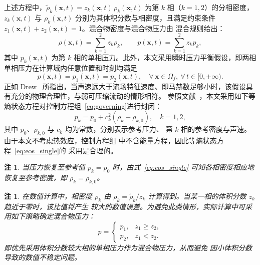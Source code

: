 \documentclass[12pt,a4paper]{article}
\newtheorem{remark}[theorem]{注}
\numberwithin{equation}{section}    %
\begin{document}
上述方程中，$\tilde{\rho}_k(\bm{x}, t) = z_k(\bm{x}, t)\,\rho_k(\bm{x}, t)$
为第 $k$ 相（$k = 1, 2$）的分相密度，$z_k(\bm{x}, t)$ 与
$\rho_k(\bm{x}, t)$ 分别为其体积分数与相密度，且满足约束条件
$z_1(\bm{x}, t) + z_2(\bm{x}, t) = 1$。混合物密度与混合物压力由
混合规则给出：
\begin{equation}
    \rho(\bm{x}, t) = \sum_{k=1}^{2} z_k \rho_k, \qquad
    p(\bm{x}, t)   = \sum_{k=1}^{2} z_k p_k,
\end{equation}
其中 $p_k(\bm{x}, t)$ 为第 $k$ 相的单相压力。此外，本文采用瞬时压力平衡假设，即两相单相压力在计算域内任意位置和时刻均满足
\begin{equation}
    p(\bm{x}, t) = p_1(\bm{x}, t) = p_2(\bm{x}, t),
    \quad \forall\, \bm{x} \in \Omega_f,\ \forall\, t \in [0, +\infty).
\end{equation}
正如 Drew~\cite{drew1982mathematical} 所指出，当声速远大于流场特征速度、即马赫数足够小时，该假设具有充分的物理合理性，与弱可压缩流动的情形相符。%
参照文献~\cite{grenier2013accurate}，本文采用如下等熵状态方程对控制方程组~\eqref{eq:governing}进行封闭：
\begin{equation}
    \label{eq:eos_single}
    p_k = p_0 + c_k^2 \left(\rho_k - \rho_{k,0}\right), \quad k = 1, 2,
\end{equation}
其中 $p_0$、$\rho_{k,0}$ 与 $c_k$ 均为常数，分别表示参考压力、
第 $k$ 相的参考密度与声速。由于本文不考虑热效应，控制方程组
中不含能量方程，因此等熵状态方程~\eqref{eq:eos_single}的
采用是合理的。


\begin{remark}
当压力恢复至参考值 $p_k = p_0$ 时，由式~\eqref{eq:eos_single}
可知各相密度相应地恢复至参考密度，即 $\rho_k = \rho_{k,0}$。
\end{remark}

\begin{remark}
在数值计算中，相密度 $\rho_k$ 由 $\rho_k = \tilde{\rho}_k / z_k$
计算得到。当某一相的体积分数 $z_k$ 趋近于零时，该比值将产生
较大的数值误差。为避免此类情形，实际计算中可采用如下策略确定混合物压力：
\begin{equation}
    p = \begin{cases}
        p_1, & z_1 \geqslant z_2, \\
        p_2, & z_1 < z_2.
    \end{cases}
\end{equation}
即优先采用体积分数较大相的单相压力作为混合物压力，从而避免
因小体积分数导致的数值不稳定问题。
\end{remark}
\end{document}
